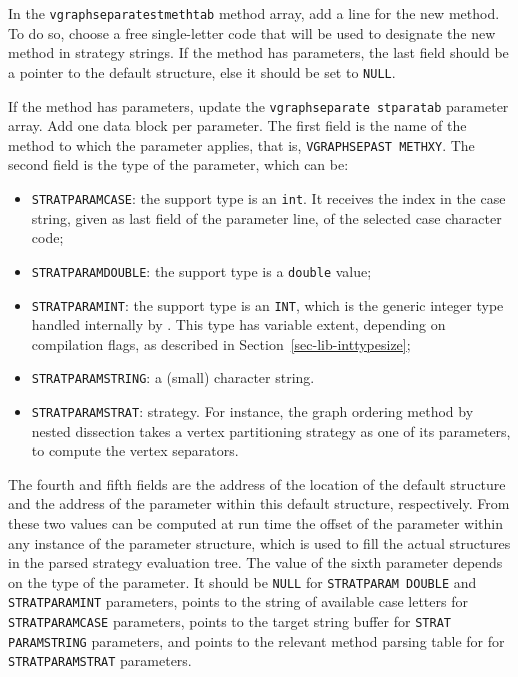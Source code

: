 \begin{enumerate}
In the {\tt vgraph\lbt separate\lbt st\lbt meth\lbt tab} method array,
add a line for the new method. To do so, choose a free single-letter
code that will be used to designate the new method in strategy strings.
If the method has parameters, the last field should be a pointer to
the default structure, else it should be set to {\tt NULL}.

If the method has parameters, update the {\tt vgraph\lbt separate\lbt
st\lbt para\lbt tab} parameter array. Add one data block per
parameter. The first field is the name of the method to which the
parameter applies, that is, {\tt VGRAPH\lbt SEPA\lbt ST\lbt
METH\lbt XY}. The second field is the type of the parameter, which can
be:
\begin{itemize}
\item
{\tt STRATPARAMCASE}: the support type is an {\tt int}. It receives
the index in the case string, given as last field of the parameter
line, of the selected case character code;
\item
{\tt STRATPARAMDOUBLE}: the support type is a {\tt double} value;
\item
{\tt STRATPARAMINT}: the support type is an {\tt INT}, which
is the generic integer type handled internally by \scotch. This type
has variable extent, depending on compilation flags,
as described in Section~\ref{sec-lib-inttypesize};
\item
{\tt STRATPARAMSTRING}: a (small) character string.
\item
{\tt STRATPARAMSTRAT}: strategy. For instance, the graph ordering
method by nested dissection takes a vertex partitioning strategy as
one of its parameters, to compute the vertex separators.
\end{itemize}
The fourth and fifth fields are the address of the location of the
default structure and the address of the parameter within this default
structure, respectively. From these two values can be computed at run
time the offset of the parameter within any instance of the parameter
structure, which is used to fill the actual structures in the parsed
strategy evaluation tree.
The value of the sixth parameter depends on the type of the
parameter. It should be {\tt NULL} for {\tt STRAT\lbt PARAM\lbt
DOUBLE} and {\tt STRAT\lbt PARAM\lbt INT} parameters, points to the
string of available case letters for {\tt STRAT\lbt PARAM\lbt CASE}
parameters, points to the target string buffer for {\tt STRAT\lbt
PARAM\lbt STRING} parameters, and points to the relevant method
parsing table for for {\tt STRAT\lbt PARAM\lbt STRAT} parameters.

\end{enumerate}
